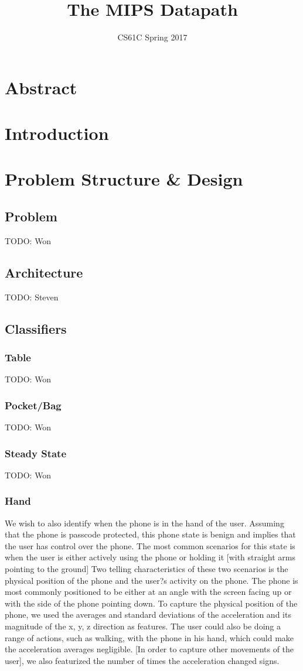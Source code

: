 \documentclass{article}
\title{The MIPS Datapath}
\author{CS61C Spring 2017}
\date{ }
\begin{document}
\maketitle
\tableofcontents
\newpage

\section{Abstract}
\section{Introduction}

\section{Problem Structure \& Design}
\subsection{Problem}
TODO: Won
\subsection{Architecture}
TODO: Steven
\subsection{Classifiers}
\subsubsection{Table}
TODO: Won
\subsubsection{Pocket/Bag}
TODO: Won
\subsubsection{Steady State}
TODO: Won
\subsubsection{Hand}
We wish to also identify when the phone is in the hand of the user.
 Assuming that the phone is passcode protected, this phone state is benign and implies that the user has control over the phone. 
The most common scenarios for this state is when the user is either actively using the phone or holding it [with straight arms pointing to the ground]
 Two telling characteristics of these two scenarios is the physical position of the phone and the user?s activity on the phone. 
The phone is most commonly positioned to be either at an angle with the screen facing up or with the side of the phone pointing down. 
To capture the physical position of the phone, we used the averages and standard deviations of the  acceleration and its magnitude of the x, y, z direction as features. 
The user could also be doing a range of actions, such as walking, with the phone in his hand, which could make the acceleration averages negligible. 
[In order to capture other movements of the user], we also featurized the number of times the acceleration changed signs. 
\end{document}
